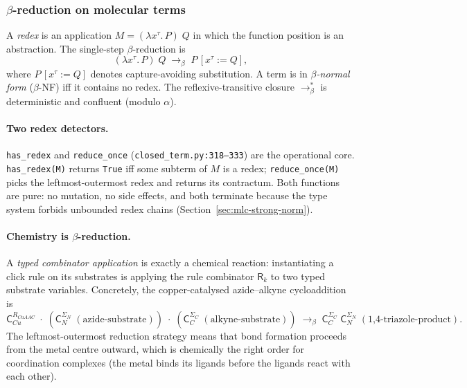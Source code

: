 \subsubsection{$\beta$-reduction on molecular terms}
\label{sec:mlc-beta}

A \emph{redex} is an application $M = (\lambda x^{\tau}.\,P)\;Q$
in which the function position is an abstraction. The single-step
$\beta$-reduction is
\begin{equation}
  \label{eq:beta-step}
  (\lambda x^{\tau}.\, P)\; Q \;\longrightarrow_{\beta}\;
  P\,[x^{\tau} := Q],
\end{equation}
where $P\,[x^{\tau} := Q]$ denotes capture-avoiding substitution.
A term is in \emph{$\beta$-normal form} ($\beta$-NF) iff it
contains no redex. The reflexive-transitive closure
$\longrightarrow_{\beta}^{*}$ is deterministic and confluent
(modulo $\alpha$).

\paragraph{Two redex detectors.}
\texttt{has\_redex} and \texttt{reduce\_once}
(\texttt{closed\_term.py:318--333}) are the operational core.
\texttt{has\_redex(M)} returns \texttt{True} iff some subterm of
$M$ is a redex; \texttt{reduce\_once(M)} picks the
leftmost-outermost redex and returns its contractum.
Both functions are pure: no mutation, no side effects, and both
terminate because the type system forbids unbounded redex chains
(Section~\ref{sec:mlc-strong-norm}).

\paragraph{Chemistry is $\beta$-reduction.}
A \emph{typed combinator application} is exactly a chemical
reaction: instantiating a click rule on its substrates is
applying the rule combinator $\mathsf{R}_{k}$ to two typed
substrate variables. Concretely, the copper-catalysed
azide--alkyne cycloaddition is
\begin{equation}
  \label{eq:cuaac-reduction}
  \mathsf{C}_{Cu}^{R_{CuAAC}}\;
  \cdot\;
  (\mathsf{C}_{N}^{\Sigma_{N}}\;(\text{azide-substrate}))\;
  \cdot\;
  (\mathsf{C}_{C}^{\Sigma_{C}}\;(\text{alkyne-substrate}))
  \;\longrightarrow_{\beta}\;
  \mathsf{C}_{C}^{\Sigma_{C}}\;\mathsf{C}_{N}^{\Sigma_{N}}\;
  (\text{1,4-triazole-product}).
\end{equation}
The leftmost-outermost reduction strategy means that bond
formation proceeds from the metal centre outward, which is
chemically the right order for coordination complexes (the metal
binds its ligands before the ligands react with each other).

